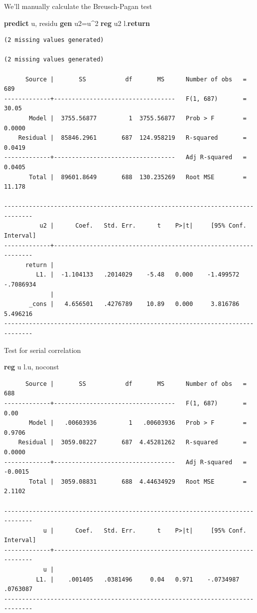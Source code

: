 \documentclass[
]{book}
\newenvironment{Shaded}{\begin{snugshade}}{\end{snugshade}}
\newcommand{\FunctionTok}[1]{\textcolor[rgb]{0.13,0.29,0.53}{\textbf{#1}}}
\newcommand{\KeywordTok}[1]{\textcolor[rgb]{0.13,0.29,0.53}{\textbf{#1}}}
\newcommand{\NormalTok}[1]{#1}
\newcommand{\OtherTok}[1]{\textcolor[rgb]{0.56,0.35,0.01}{#1}}
\begin{document}
We'll manually calculate the Breusch-Pagan test

\begin{Shaded}
\begin{Highlighting}[]
\KeywordTok{predict}\NormalTok{ u, residu}
\KeywordTok{gen}\NormalTok{ u2=u\^{}2}
\KeywordTok{reg}\NormalTok{ u2 }\OtherTok{l}\NormalTok{.}\FunctionTok{return}
\end{Highlighting}
\end{Shaded}

\begin{verbatim}
(2 missing values generated)

(2 missing values generated)

      Source |       SS           df       MS      Number of obs   =       689
-------------+----------------------------------   F(1, 687)       =     30.05
       Model |  3755.56877         1  3755.56877   Prob > F        =    0.0000
    Residual |  85846.2961       687  124.958219   R-squared       =    0.0419
-------------+----------------------------------   Adj R-squared   =    0.0405
       Total |  89601.8649       688  130.235269   Root MSE        =    11.178

------------------------------------------------------------------------------
          u2 |      Coef.   Std. Err.      t    P>|t|     [95% Conf. Interval]
-------------+----------------------------------------------------------------
      return |
         L1. |  -1.104133   .2014029    -5.48   0.000    -1.499572   -.7086934
             |
       _cons |   4.656501   .4276789    10.89   0.000     3.816786    5.496216
------------------------------------------------------------------------------
\end{verbatim}

Test for serial correlation

\begin{Shaded}
\begin{Highlighting}[]
\KeywordTok{reg}\NormalTok{ u }\OtherTok{l}\NormalTok{.u, noconst}
\end{Highlighting}
\end{Shaded}

\begin{verbatim}
      Source |       SS           df       MS      Number of obs   =       688
-------------+----------------------------------   F(1, 687)       =      0.00
       Model |   .00603936         1   .00603936   Prob > F        =    0.9706
    Residual |  3059.08227       687  4.45281262   R-squared       =    0.0000
-------------+----------------------------------   Adj R-squared   =   -0.0015
       Total |  3059.08831       688  4.44634929   Root MSE        =    2.1102

------------------------------------------------------------------------------
           u |      Coef.   Std. Err.      t    P>|t|     [95% Conf. Interval]
-------------+----------------------------------------------------------------
           u |
         L1. |    .001405   .0381496     0.04   0.971    -.0734987    .0763087
------------------------------------------------------------------------------
\end{verbatim}
\end{document}
